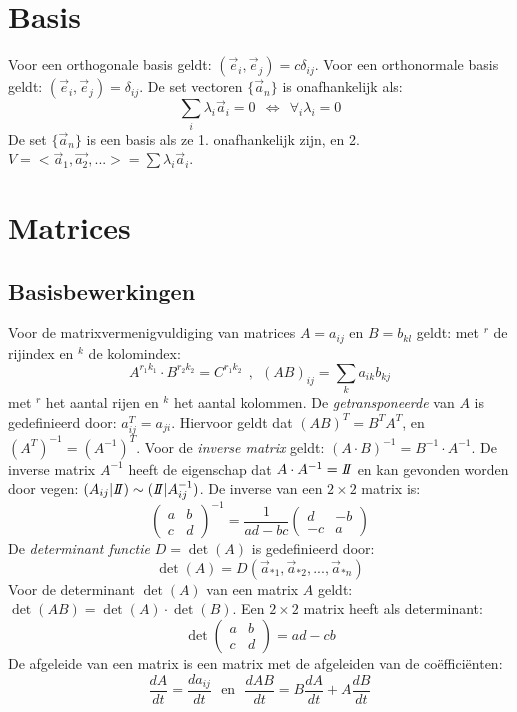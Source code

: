 \section{Basis}
Voor een orthogonale basis geldt: $(\vec{e}_i,\vec{e}_j)=c\delta_{ij}$. Voor
een orthonormale basis geldt: $(\vec{e}_i,\vec{e}_j)=\delta_{ij}$.
\npar
De set vectoren $\{\vec{a}_n\}$ is onafhankelijk als:
\[
\sum\limits_i\lambda_i\vec{a}_i=0~~\Leftrightarrow~~\forall_i\lambda_i=0
\]
De set $\{\vec{a}_n\}$ is een basis als ze 1. onafhankelijk zijn, en 2.
$V=<\vec{a}_1,\vec{a_2},...>=\sum\lambda_i\vec{a}_i$.

\section{Matrices}
\subsection{Basisbewerkingen}
Voor de matrixvermenigvuldiging van matrices $A=a_{ij}$ en $B=b_{kl}$ geldt:
met $^r$ de rijindex en $^k$ de kolomindex:
\[
A^{r_1k_1}\cdot B^{r_2k_2}=C^{r_1k_2}~~,~~(AB)_{ij}=\sum_ka_{ik}b_{kj}
\]
met $^r$ het aantal rijen en $^k$ het aantal kolommen.
\npar
De {\it getransponeerde} van $A$ is gedefinieerd door: $a_{ij}^T=a_{ji}$.
Hiervoor geldt dat $(AB)^T=B^TA^T$, en $(A^T)^{-1}=(A^{-1})^T$. Voor de
{\it inverse matrix} geldt: $(A\cdot B)^{-1}=B^{-1}\cdot A^{-1}$. De inverse
matrix $A^{-1}$ heeft de eigenschap dat $A\cdot A^{-1}=I\hspace{-1mm}I$ en kan gevonden
worden door vegen: $(A_{ij}|I\hspace{-1mm}I)\sim(I\hspace{-1mm}I|A_{ij}^{-1})$.
\npar
De inverse van een $2\times2$ matrix is:
\[
\left(\begin{array}{cc}a&b\\ c&d\end{array}\right)^{-1}=\frac{1}{ad-bc}
\left(\begin{array}{cc}d&-b\\ -c&a\end{array}\right)
\]
\npar
De {\it determinant functie} $D=\det(A)$ is gedefinieerd door:
\[
\det(A)=D(\vec{a}_{*1},\vec{a}_{*2},...,\vec{a}_{*n})
\]
Voor de determinant $\det(A)$ van een matrix $A$ geldt:
$\det(AB)=\det(A)\cdot\det(B)$. Een $2\times2$ matrix heeft als determinant:
\[
\det\left(\begin{array}{cc}a&b\\ c&d \end{array}\right)=ad-cb
\]
De afgeleide van een matrix is een matrix met de afgeleiden van de co\"effici\"enten:
\[
\frac{dA}{dt}=\frac{da_{ij}}{dt}~~~\mbox{en}~~~\frac{dAB}{dt}=B\frac{dA}{dt}+A\frac{dB}{dt}
\]
